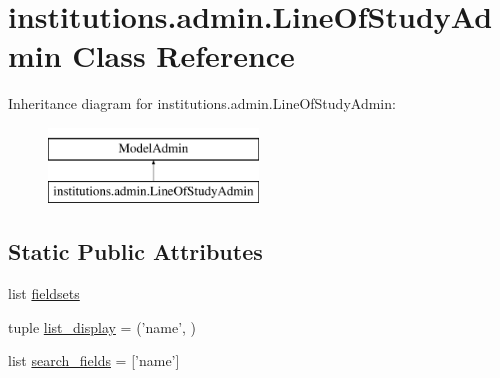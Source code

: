 \hypertarget{classinstitutions_1_1admin_1_1_line_of_study_admin}{\section{institutions.\-admin.\-Line\-Of\-Study\-Admin Class Reference}
\label{classinstitutions_1_1admin_1_1_line_of_study_admin}
}
Inheritance diagram for institutions.\-admin.\-Line\-Of\-Study\-Admin\-:\begin{figure}[H]
\begin{center}
\leavevmode
\includegraphics[height=2.000000cm]{classinstitutions_1_1admin_1_1_line_of_study_admin}
\end{center}
\end{figure}
\subsection*{Static Public Attributes}
\begin{DoxyCompactItemize}
\item 
list \hyperlink{classinstitutions_1_1admin_1_1_line_of_study_admin_ae095c566d0a9659d1f1e219b85338868}{fieldsets}
\item 
tuple \hyperlink{classinstitutions_1_1admin_1_1_line_of_study_admin_a4752ddfdf339d1f16aaf054f1b86bd89}{list\-\_\-display} = ('name', )
\item 
list \hyperlink{classinstitutions_1_1admin_1_1_line_of_study_admin_a462d2869dfbdf18d70be799114a3835b}{search\-\_\-fields} = \mbox{[}'name'\mbox{]}
\end{DoxyCompactItemize}


